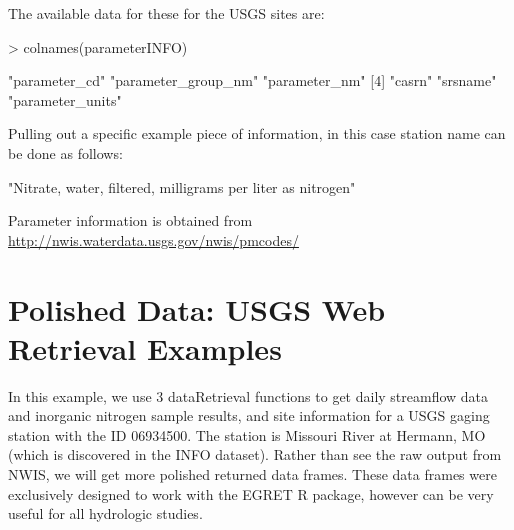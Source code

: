 \documentclass[a4paper,11pt]{article}
\begin{document}
The available data for these for the USGS sites are:
\begin{Schunk}
\begin{Sinput}
> colnames(parameterINFO)
\end{Sinput}
\begin{Soutput}
[1] "parameter_cd"       "parameter_group_nm" "parameter_nm"      
[4] "casrn"              "srsname"            "parameter_units"   
\end{Soutput}
\end{Schunk}
Pulling out a specific example piece of information, in this case station name can be done as follows:
\begin{Schunk}
\begin{Soutput}
[1] "Nitrate, water, filtered, milligrams per liter as nitrogen"
\end{Soutput}
\end{Schunk}
Parameter information is obtained from \url{http://nwis.waterdata.usgs.gov/nwis/pmcodes/}


\section{Polished Data: USGS Web Retrieval Examples}
In this example, we use 3 dataRetrieval functions to get daily streamflow data and inorganic nitrogen sample results, and site information for a USGS gaging station with the ID 06934500.  The station is Missouri River at Hermann, MO (which is discovered in the INFO dataset). Rather than see the raw output from NWIS, we will get more polished returned data frames.  These data frames were exclusively designed to work with the EGRET R package, however can be very useful for all hydrologic studies.
\end{document}
